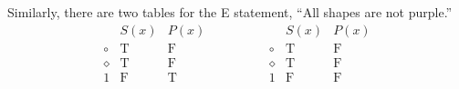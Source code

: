 \documentclass[a4paper]{exam}
\newcommand\T{\ensuremath{\mathrm{T}}}
\newcommand\F{\ensuremath{\mathrm{F}}}
\begin{document}
\begin{questions}
Similarly, there are two tables for the E statement, ``All shapes are not purple.''
  \[
    \begin{array}{c|cc}
      & S(x) & P(x) \\\hline
      \circ & \T & \F \\
      \diamond & \T & \F \\
      1 & \F & \T \\
    \end{array}
    \hspace{50pt} %
    \begin{array}{c|cc}
      & S(x) & P(x) \\\hline
      \circ & \T & \F \\
      \diamond & \T & \F \\
      1 & \F & \F \\
    \end{array}
\]
\begin{parts}

\end{parts}
\end{questions}
\end{document}
